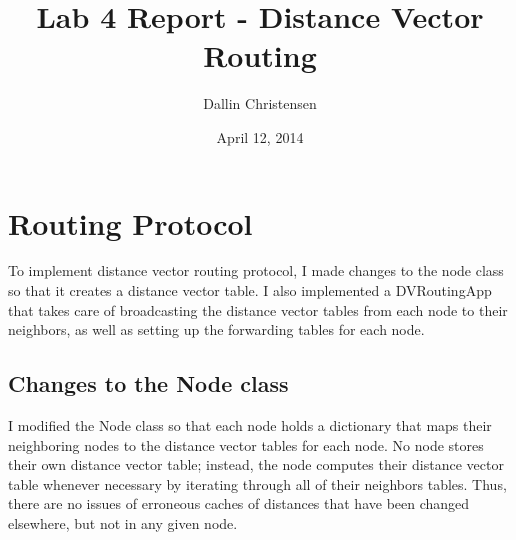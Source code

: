 \documentclass[11pt]{article}
\begin{document}
\lstset{
  language=Python,
  basicstyle=\small,          %
  keywordstyle=\bfseries,
  identifierstyle=,           %
  commentstyle=,              %
  stringstyle=\ttfamily,      %
  showstringspaces=false,     %
  numbers=left,
  numberstyle=\tiny,
  numbersep=5pt,
  frame=tb,
}

\title{Lab 4 Report - Distance Vector Routing}

\author{Dallin Christensen}

\date{April 12, 2014}

\maketitle

\section{Routing Protocol}
To implement distance vector routing protocol, I made changes to the node class so that it creates a distance vector table. I also implemented a DVRoutingApp that takes care of broadcasting the distance vector tables from each node to their neighbors, as well as setting up the forwarding tables for each node.

\subsection{Changes to the Node class}
I modified the Node class so that each node holds a dictionary that maps their neighboring nodes to the distance vector tables for each node. No node stores their own distance vector table; instead, the node computes their distance vector table whenever necessary by iterating through all of their neighbors tables. Thus, there are no issues of erroneous caches of distances that have been changed elsewhere, but not in any given node.
\end{document}
